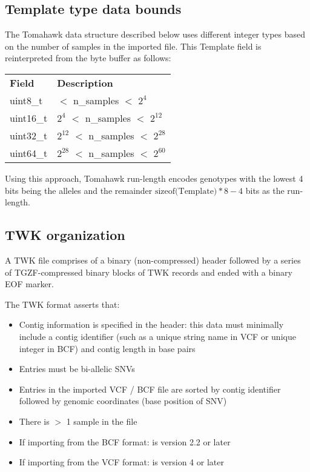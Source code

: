\documentclass[10pt]{article}
\begin{document}
\subsection{Template type data bounds}
The Tomahawk data structure described below uses different integer types based on the number of samples in the imported file. This Template field is reinterpreted from the byte buffer as follows:
\begin{table}[H]
  {\small
\begin{tabular}{|l|l|}
  \cline{1-2}
  {\bf Field} & {\bf Description} \\ \cline{1-2}
  {\sf uint8\_t} & {\sf 0 $<$ n\_samples $<$ $2^4$} \\ \cline{1-2}
  {\sf uint16\_t} & {\sf $2^4$ $<$ n\_samples $<$ $2^{12}$} \\ \cline{1-2}
  {\sf uint32\_t} & {\sf $2^{12}$ $<$ n\_samples $<$ $2^{28}$} \\ \cline{1-2}
  {\sf uint64\_t} & {\sf $2^{28}$ $<$ n\_samples $<$ $2^{60}$} \\ \cline{1-2}
  \end{tabular}}
\end{table}
Using this approach, Tomahawk run-length encodes genotypes with the lowest 4 bits being the alleles and the remainder $\text{sizeof(Template)} * 8 - 4$ bits as the run-length.

\subsection{TWK organization}
A TWK file comprises of a binary (non-compressed) header followed by a series of TGZF-compressed binary blocks of TWK records and ended with a binary EOF marker.

The TWK format asserts that:
\begin{itemize}
\item Contig information is specified in the header: this data must minimally include a contig identifier (such as a unique string name in VCF or unique integer in BCF) and contig length in base pairs
\item Entries must be bi-allelic SNVs
\item Entries in the imported VCF / BCF file are sorted by contig identifier followed by genomic coordinates (base position of SNV)
\item There is $>$ 1 sample in the file
\item If importing from the BCF format: is version 2.2 or later
\item If importing from the VCF format: is version 4 or later
\end{itemize}
\end{document}
